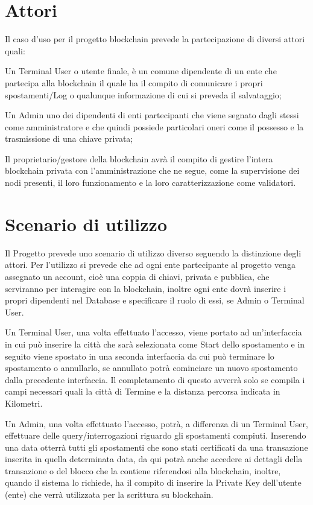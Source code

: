 \documentclass[11pt,a4paper,titlepage]{report}
\begin{document}
\section{Attori}
Il caso d'uso per il progetto blockchain prevede la partecipazione di diversi attori quali: 

Un Terminal User o utente finale, è un comune dipendente di un ente che partecipa alla blockchain il quale ha il compito di comunicare i propri spostamenti/Log o qualunque informazione di cui si preveda il salvataggio;

Un Admin uno dei dipendenti di enti partecipanti che viene segnato dagli stessi come amministratore e che quindi possiede  particolari oneri come il possesso e la trasmissione di una chiave privata;

Il proprietario/gestore della blockchain avrà il compito di gestire l'intera blockchain privata con l'amministrazione che ne segue, come la supervisione dei nodi presenti, il loro funzionamento e la loro caratterizzazione come validatori. 

\section{Scenario di utilizzo}
Il Progetto prevede uno scenario di utilizzo diverso seguendo la distinzione degli attori.
Per l'utilizzo si prevede che ad ogni ente partecipante al progetto venga assegnato un account, cioè una coppia di chiavi, privata e pubblica, che serviranno per interagire con la blockchain, inoltre ogni ente dovrà inserire i propri dipendenti nel Database e specificare il ruolo di essi, se Admin o Terminal User.

Un Terminal User, una volta effettuato l'accesso, viene portato ad un'interfaccia in cui può inserire la città che sarà selezionata come Start dello spostamento e in seguito viene spostato in una seconda interfaccia da cui può terminare lo spostamento o annullarlo, se annullato potrà cominciare un nuovo spostamento dalla precedente interfaccia. Il completamento di questo avverrà solo se compila i campi necessari quali la città di Termine e la distanza percorsa indicata in Kilometri.

Un Admin, una volta effettuato l'accesso, potrà, a differenza di un Terminal User, effettuare delle query/interrogazioni riguardo gli spostamenti compiuti. Inserendo una data otterrà tutti gli spostamenti che sono stati certificati da una transazione inserita in quella determinata data, da qui potrà anche accedere ai dettagli della transazione o del blocco che la contiene riferendosi alla blockchain, inoltre, quando il sistema lo richiede, ha il compito di inserire la Private Key dell'utente (ente) che verrà utilizzata per la scrittura su blockchain.
\end{document}
